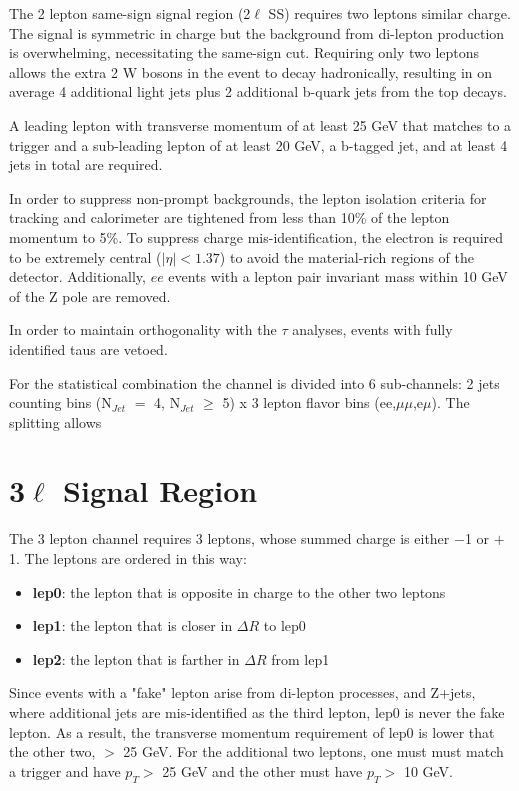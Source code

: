 The 2 lepton same-sign signal region (2$\ell$ SS) requires two leptons similar charge. The signal is symmetric in charge but
the background from \ttbar di-lepton production is overwhelming, necessitating the same-sign cut. Requiring
only two leptons allows the extra 2 W bosons in the event to decay hadronically, resulting in on average 4 additional
light jets plus 2 additional b-quark jets from the top decays. 

A leading lepton with transverse momentum of at least 25 GeV that matches to a
trigger and a sub-leading lepton of at least 20 GeV, a b-tagged jet, and at least 4 jets in
total are required.  

In order to suppress non-prompt backgrounds, the lepton isolation criteria for tracking and 
calorimeter are tightened from less than 10\% of the lepton momentum to 5\%. To suppress
charge mis-identification, the electron is required to be extremely central ($|\eta| < 1.37$) 
to avoid the material-rich regions of the detector. Additionally, $ee$ events with a 
lepton pair invariant mass within 10 GeV of the Z pole are removed. 

In order to maintain orthogonality with the $\tau$ analyses, events with fully identified
taus are vetoed.

For the statistical combination the channel is divided into 6 sub-channels:
2 jets counting bins (N$_{Jet}$ $=$ 4, N$_{Jet}$ $\geq$ 5) x 3 lepton flavor bins (ee,$\mu\mu$,e$\mu$). 
The splitting allows

\section{3$\ell$ Signal Region}

The 3 lepton channel requires 3 leptons, whose summed charge is either
$-$1 or $+$1. 
The leptons are ordered in this way:

\begin{itemize}
\item {\bf lep0}: the lepton that is opposite in charge to the other two leptons
\item {\bf lep1}: the lepton that is closer in $\Delta R$ to lep0
\item {\bf lep2}: the lepton that is farther in $\Delta R$ from lep1
\end{itemize}

Since events with a "fake" lepton arise from di-lepton processes, \ttbar and Z+jets, where additional jets are 
mis-identified as the third lepton, lep0 is never the fake lepton. As a result, the transverse momentum 
requirement of lep0 is lower that the other two, $>$ 25 GeV. For the additional two leptons, one must
must match a trigger and have $p_T >$ 25 GeV and the other must have $p_T >$ 10 GeV. 


